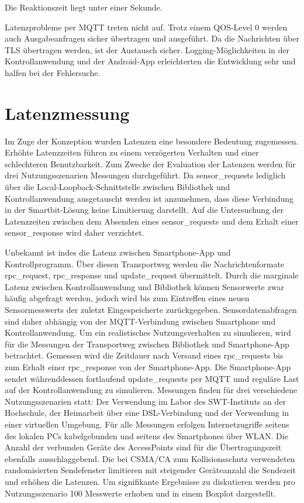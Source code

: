 \documentclass[11pt,a4paper]{report}
\begin{document}
Die Reaktionszeit liegt unter einer Sekunde.

Latenzprobleme per MQTT treten nicht auf.
Trotz einem QOS-Level 0 werden auch Ausgabeanfragen sicher übertragen und ausgeführt.
Da die Nachrichten über TLS übertragen werden, ist der Austausch sicher.
Logging-Möglichkeiten in der Kontrollanwendung und der Android-App erleichterten die Entwicklung sehr und halfen bei der Fehlersuche.


\section{Latenzmessung}
Im Zuge der Konzeption wurden Latenzen eine besondere Bedeutung zugemessen.
Erhöhte Latenzzeiten führen zu einem verzögerten Verhalten und einer schlechteren Benutzbarkeit.
Zum Zwecke der Evaluation der Latenzen werden für drei Nutzungsszenarien Messungen durchgeführt.
Da sensor\_requests lediglich über die Local-Loopback-Schnittstelle zwischen Bibliothek und Kontrollanwendung ausgetauscht werden ist anzunehmen, dass diese Verbindung in der Smartbit-Lösung keine Limitierung darstellt.
Auf die Untersuchung der Latenzzeiten zwischen dem Absenden eines sensor\_requests und dem Erhalt einer sensor\_response wird daher verzichtet.

Unbekannt ist indes die Latenz zwischen Smartphone-App und Kontrollprogramm.
Über diesen Transportweg werden die Nachrichtenformate rpc\_request, rpc\_response und update\_request übermittelt.
Durch die marginale Latenz zwischen Kontrollanwendung und Bibliothek können Sensorwerte zwar häufig abgefragt werden, jedoch wird bis zum Eintreffen eines neuen Sensormesswerts der zuletzt Eingespeicherte zurückgegeben.
Sensordatenabfragen sind daher abhängig von der MQTT-Verbindung zwischen Smartphone und Kontrollanwendung.
Um ein realistisches Nutzungsverhalten zu simulieren, wird für die Messungen der Transportweg zwischen Bibliothek und Smartphone-App betrachtet.
Gemessen wird die Zeitdauer nach Versand eines rpc\_requests bis zum Erhalt einer rpc\_response von der Smartphone-App.
Die Smartphone-App sendet währenddessen fortlaufend update\_requests per MQTT umd reguläre Last auf der Kontrollanwendung zu simulieren.
Messungen finden für drei verschiedene Nutzungsszenarien statt: Der Verwendung im Labor des SWT-Instituts an der Hochschule, der Heimarbeit über eine DSL-Verbindung und der Verwendung in einer virtuellen Umgebung.
Für alle Messungen erfolgen Internetzugriffe seitens des lokalen PCs kabelgebunden und seitens des Smartphones über WLAN.
Die Anzahl der verbunden Geräte des AccessPoints sind für die Übertragungszeit ebenfalls ausschlaggebend.
Die bei CSMA/CA zum Kollisionsschutz verwendeten randomisierten Sendefenster limitieren mit steigender Geräteanzahl die Sendezeit und erhöhen die Latenzen.
Um signifikante Ergebnisse zu diskutieren werden pro Nutzungsszenario 100 Messwerte erhoben und in einem Boxplot dargestellt.
\end{document}

